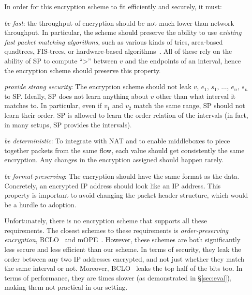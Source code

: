 %
In order for this encryption scheme to fit \sys efficiently and securely, it must:

\begin{CompactEnumerate}[leftmargin=*]

\item  {\em be fast}: the throughput of encryption should be not much lower than network throughput. In particular, the scheme should preserve the ability to use {\em existing fast packet matching algorithms}, such as  various kinds of tries, area-based quadtrees, FIS-trees, or hardware-based algorithms~\cite{packet_classif}.  All of these rely on the ability of SP  to compute ``>'' between $v$ and the endpoints of an interval,
hence the encryption scheme should preserve this property. 




\item {\em provide strong security}: The encryption scheme should not leak $v$, $e_1$, $s_1$, $\dots$, $e_n$, $s_n$ to SP.
Ideally, SP does not learn anything about $v$ other than what interval it matches to. In  particular, even if $v_1$ and $v_2$ match the same range, SP should not learn their order. SP is allowed to learn the order relation of the intervals (in fact, in many setups, SP provides the intervals). \label{req:sec}


\item {\em be deterministic}: To integrate with NAT and to enable middleboxes to piece together packets from the same flow, each value should get  consistently  the same encryption. Any changes in the encryption assigned should happen rarely.  \label{req:injective}

\item {\em be format-preserving}: The encryption should have the same format as the data. Concretely, an encrypted IP address should look like an IP address.  This property is important to avoid changing the packet header structure, which would be a hurdle to adoption. 
 \end{CompactEnumerate}


Unfortunately, there is no encryption scheme that supports all these requirements. The closest schemes to these requirements  is {\em order-preserving encryption}, BCLO~\cite{boldyreva:ope} and mOPE~\cite{popa:mope}. However, these schemes are both significantly less secure and less efficient than our scheme. In terms of security, they leak the order between any two IP addresses encrypted, and not just whether they match the same interval or not. Moreover, BCLO~\cite{boldyreva:ope} leaks the top half of the bits too. In terms of performance, they are  times slower (as demonstrated in \S\ref{sec:eval}), making them not practical in our setting. 


